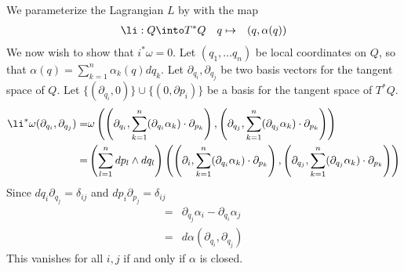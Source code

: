 

    We parameterize the Lagrangian $L$ by with the map 
    \begin{align*}
        \li: Q\into& T^*Q &&
        q\mapsto&(q, \alpha(q))
    \end{align*}
    We now wish to show that $i^*\omega=0$. 
    Let $(q_1, \ldots q_n)$ be local coordinates on $Q$, so that $\alpha(q)=\sum_{k=1}^n \alpha_k(q)dq_{k}$. 
    Let $\partial_{q_i}, \partial_{q_j}$ be two basis vectors for the tangent space of $Q$. 
    Let $\{(\partial_{q_i}, 0)\}\cup\{(0, \partial p_i)\}$ be a basis for the tangent space of $T^*Q$.
    \begin{align*}
        \li^*\omega(\partial_{q_i}, \partial_{q_j})=& \omega \left(\left(\partial_{q_i}, \sum_{k=1}^n (\partial_{q_i}\alpha_k )\cdot \partial_{p_k}\right), \left(\partial_{q_j}, \sum_{k=1}^n (\partial_{q_j} \alpha_k)\cdot \partial_{p_k}\right)\right)\\
        =&\left( \sum_{l=1}^n dp_l \wedge dq_l\right) \left(\left(\partial_i, \sum_{k=1}^n (\partial_{q_i}\alpha_k )\cdot \partial_{p_k}\right), \left(\partial_{q_j}, \sum_{k=1}^n (\partial_{q_j} \alpha_k )\cdot\partial_{p_k}\right)\right)\\
    \end{align*}
    Since $dq_i\partial_{q_j}=\delta_{ij}$ and $dp_i\partial_{p_j}=\delta_{ij}$
    \begin{align*}
        =& \partial_{q_j} \alpha_i - \partial_{q_i} \alpha_j\\
        =& d\alpha(\partial_{q_i}, \partial_{q_j})
    \end{align*}
    This vanishes for all $i, j$ if and only if $\alpha$ is closed. 

